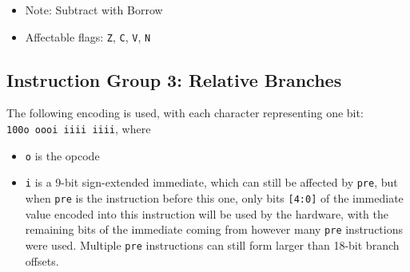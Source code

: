 \documentclass{article}
\begin{document}
\begin{itemize}
\begin{itemize}
			\item Note:  Subtract with Borrow
			\item Affectable flags:
				\texttt{Z}, \texttt{C}, \texttt{V}, \texttt{N}
		\end{itemize}
	\end{itemize}




	\doublespacing
	\subsection{Instruction Group 3:  Relative Branches}
	The following encoding is used, with each character representing one
	bit:  \\
	\texttt{100o oooi iiii iiii}, where

	\singlespacing
	\begin{itemize}
		\item \texttt{o} is the opcode
		\item \texttt{i} is a 9-bit sign-extended immediate, which can
		still be affected by \texttt{pre}, but when \texttt{pre} is the
		instruction before this one, only bits \texttt{[4:0]} of the
		immediate value encoded into this instruction will be used by the
		hardware, with the remaining bits of the immediate coming from
		however many \texttt{pre} instructions were used.  Multiple
		\texttt{pre} instructions can still form larger than 18-bit branch
		offsets.
	\end{itemize}
	\doublespacing
\end{document}

